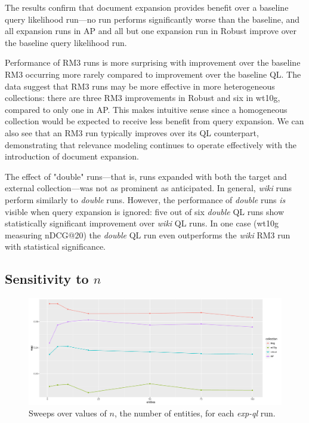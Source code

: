 \documentclass{sig-alternate}
\begin{document}
The results confirm that document expansion provides benefit over a baseline query likelihood run---no run performs significantly worse than the baseline, and all expansion runs in AP and all but one expansion run in Robust improve over the baseline query likelihood run. %

Performance of RM3 runs is more surprising with improvement over the baseline RM3 occurring more rarely compared to improvement over the baseline QL. The data suggest that RM3 runs may be more effective in more heterogeneous collections: there are three RM3 improvements in Robust and six in wt10g, compared to only one in AP. This makes intuitive sense since a homogeneous collection would be expected to receive less benefit from query expansion. We can also see that an RM3 run typically improves over its QL counterpart, demonstrating that relevance modeling continues to operate effectively with the introduction of document expansion.

The effect of "double" runs---that is, runs expanded with both the target and external collection---was not as prominent as anticipated. In general, \textit{wiki} runs perform similarly to \textit{double} runs. However, the performance of \textit{double} runs \textit{is} visible when query expansion is ignored: five out of six \textit{double} QL runs show statistically significant improvement over \textit{wiki} QL runs. In one case (wt10g measuring nDCG@20) the \textit{double} QL run even outperforms the \textit{wiki} RM3 run with statistical significance.

\subsection{Sensitivity to $n$}\label{section.n-sensitivity}

\begin{figure}[!htb]
\centering
\includegraphics[width=\columnwidth]{figures/n-sweep.pdf}
\caption{Sweeps over values of $n$, the number of entities, for each \textit{exp-ql} run.}
\label{figure.n-sweeps}
\end{figure}
\end{document}
